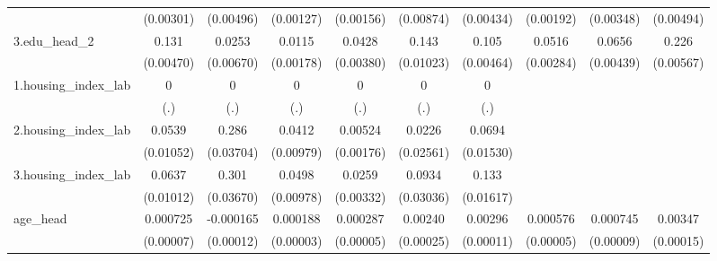 \begin{table}[htbp]
\begin{tabular}{l*{9}{c}}
            &   (0.00301)         &   (0.00496)         &   (0.00127)         &   (0.00156)         &   (0.00874)         &   (0.00434)         &   (0.00192)         &   (0.00348)         &   (0.00494)         \\
3.edu\_head\_2&       0.131\sym{***}&      0.0253\sym{***}&      0.0115\sym{***}&      0.0428\sym{***}&       0.143\sym{***}&       0.105\sym{***}&      0.0516\sym{***}&      0.0656\sym{***}&       0.226\sym{***}\\
            &   (0.00470)         &   (0.00670)         &   (0.00178)         &   (0.00380)         &   (0.01023)         &   (0.00464)         &   (0.00284)         &   (0.00439)         &   (0.00567)         \\
1.housing\_index\_lab&           0         &           0         &           0         &           0         &           0         &           0         &                     &                     &                     \\
            &         (.)         &         (.)         &         (.)         &         (.)         &         (.)         &         (.)         &                     &                     &                     \\
2.housing\_index\_lab&      0.0539\sym{***}&       0.286\sym{***}&      0.0412\sym{***}&     0.00524\sym{***}&      0.0226         &      0.0694\sym{***}&                     &                     &                     \\
            &   (0.01052)         &   (0.03704)         &   (0.00979)         &   (0.00176)         &   (0.02561)         &   (0.01530)         &                     &                     &                     \\
3.housing\_index\_lab&      0.0637\sym{***}&       0.301\sym{***}&      0.0498\sym{***}&      0.0259\sym{***}&      0.0934\sym{***}&       0.133\sym{***}&                     &                     &                     \\
            &   (0.01012)         &   (0.03670)         &   (0.00978)         &   (0.00332)         &   (0.03036)         &   (0.01617)         &                     &                     &                     \\
age\_head    &    0.000725\sym{***}&   -0.000165         &    0.000188\sym{***}&    0.000287\sym{***}&     0.00240\sym{***}&     0.00296\sym{***}&    0.000576\sym{***}&    0.000745\sym{***}&     0.00347\sym{***}\\
            &   (0.00007)         &   (0.00012)         &   (0.00003)         &   (0.00005)         &   (0.00025)         &   (0.00011)         &   (0.00005)         &   (0.00009)         &   (0.00015)         \\

\end{tabular}
\end{table}

